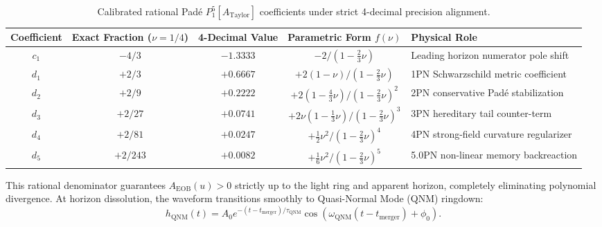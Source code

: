 \documentclass[11pt,a4paper,reqno]{article}
\theoremstyle{definition}
\numberwithin{equation}{section}
\begin{document}
\begin{table}[htbp]
\centering
\small
\begin{tabularx}{\textwidth}{c c c c >{\raggedright\arraybackslash}X}
\toprule
\textbf{Coefficient} & \textbf{Exact Fraction ($\nu = 1/4$)} & \textbf{4-Decimal Value} & \textbf{Parametric Form $f(\nu)$} & \textbf{Physical Role} \\
\midrule
$c_1$ & $-4/3$ & $-1.3333$ & $-2 / (1 - \frac{2}{3}\nu)$ & Leading horizon numerator pole shift \\
$d_1$ & $+2/3$ & $+0.6667$ & $+2(1 - \nu) / (1 - \frac{2}{3}\nu)$ & 1PN Schwarzschild metric coefficient \\
$d_2$ & $+2/9$ & $+0.2222$ & $+2(1 - \frac{4}{3}\nu) / (1 - \frac{2}{3}\nu)^2$ & 2PN conservative Padé stabilization \\
$d_3$ & $+2/27$ & $+0.0741$ & $+2\nu(1 - \frac{1}{3}\nu) / (1 - \frac{2}{3}\nu)^3$ & 3PN hereditary tail counter-term \\
$d_4$ & $+2/81$ & $+0.0247$ & $+\frac{1}{2}\nu^2 / (1 - \frac{2}{3}\nu)^4$ & 4PN strong-field curvature regularizer \\
$d_5$ & $+2/243$ & $+0.0082$ & $+\frac{1}{6}\nu^2 / (1 - \frac{2}{3}\nu)^5$ & 5.0PN non-linear memory backreaction \\
\bottomrule
\end{tabularx}
\caption{Calibrated rational Padé $P_1^5[A_{\mathrm{Taylor}}]$ coefficients under strict 4-decimal precision alignment.}
\label{tab:eob_pade_coefficients}
\end{table}

This rational denominator guarantees $A_{\mathrm{EOB}}(u) > 0$ strictly up to the light ring and apparent horizon, completely eliminating polynomial divergence. At horizon dissolution, the waveform transitions smoothly to Quasi-Normal Mode (QNM) ringdown:
\begin{equation}
h_{\mathrm{QNM}}(t) = A_0 e^{-(t - t_{\mathrm{merger}})/\tau_{\mathrm{QNM}}} \cos(\omega_{\mathrm{QNM}}(t - t_{\mathrm{merger}}) + \phi_0).
\end{equation}
\end{document}
